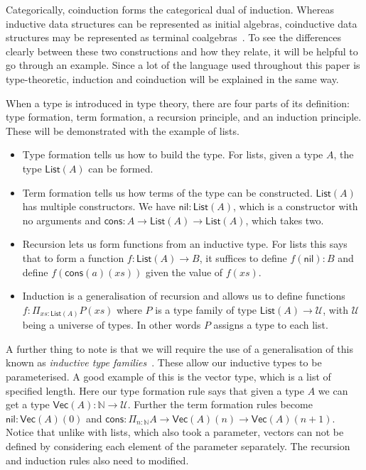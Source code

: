 \documentclass{article}
\begin{document}
Categorically, coinduction forms the categorical dual of induction.
Whereas inductive data structures can be represented as initial
algebras, coinductive data structures may be represented as terminal
coalgebras~\cite{jacobs1997tutorial}. To see the differences clearly
between these two constructions and how they relate, it will be
helpful to go through an example. Since a lot of the language used
throughout this paper is type-theoretic, induction and coinduction
will be explained in the same way.

When a type is introduced in type theory, there are four parts of its
definition: type formation, term formation, a recursion principle, and
an induction principle. These will be demonstrated with the example of
lists.
\begin{itemize}
\item Type formation tells us how to build the type. For lists, given
  a type \(A\), the type \(\mathsf{List}(A)\) can be formed.
\item Term formation tells us how terms of the type can be
  constructed. \(\mathsf{List}(A)\) has multiple constructors. We have
  \(\mathsf{nil} : \mathsf{List}(A)\), which is a constructor with no
  arguments and \(\mathsf{cons} : A \to \mathsf{List}(A) \to
  \mathsf{List}(A)\), which takes two.
\item Recursion lets us form functions from an inductive type. For
  lists this says that to form a function \(f : \mathsf{List}(A) \to
  B\), it suffices to define \(f(\mathsf{nil}) : B\) and define
  \(f(\mathsf{cons}(a)(xs))\) given the value of \(f(xs)\).
\item Induction is a generalisation of recursion and allows us to
  define functions \(f : \Pi_{xs : \mathsf{List}(A)} P(xs)\) where
  \(P\) is a type family of type \(\mathsf{List}(A) \to \mathcal{U}\),
  with \(\mathcal{U}\) being a universe of types. In other words \(P\)
  assigns a type to each list.
\end{itemize}

A further thing to note is that we will require the use of a
generalisation of this known as \emph{inductive type
  families}~\cite[Section 5.7]{hottbook}. These allow our inductive
types to be parameterised. A good example of this is the vector type,
which is a list of specified length. Here our type formation rule says
that given a type \(A\) we can get a type \(\mathsf{Vec}(A) :
\mathbb{N} \to \mathcal{U}\). Further the term formation rules become
\(\mathsf{nil} : \mathsf{Vec}(A)(0)\) and \(\mathsf{cons} : \Pi_{n :
  \mathbb{N}} A \to \mathsf{Vec}(A)(n) \to
\mathsf{Vec}(A)(n + 1)\). Notice that unlike with lists,
which also took a parameter, vectors can not be defined by considering
each element of the parameter separately. The recursion and induction
rules also need to modified.
\end{document}
